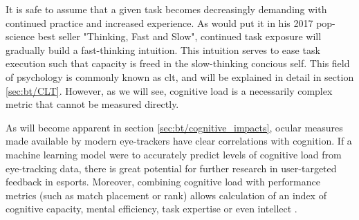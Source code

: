 It is safe to assume that a given task becomes decreasingly demanding with continued practice and increased experience. As \textcite{kahneman2017} would put it in his 2017 pop-science best seller "Thinking, Fast and Slow", continued task exposure will gradually build a fast-thinking intuition. This intuition serves to ease task execution such that capacity is freed in the slow-thinking concious self. This field of psychology is commonly known as \acrfull{clt}, and will be explained in detail in section \ref{sec:bt/CLT}. However, as we will see, cognitive load is a necessarily complex metric that cannot be measured directly. 


As will become apparent in section \ref{sec:bt/cognitive_impacts}, ocular measures made available by modern eye-trackers have clear correlations with cognition. If a machine learning model were to accurately predict levels of cognitive load from eye-tracking data, there is great potential for further research in user-targeted feedback in esports. Moreover, combining cognitive load with performance metrics (such as match placement or rank) allows calculation of an index of cognitive capacity, mental efficiency, task expertise or even intellect \cite{sweller1998}.



